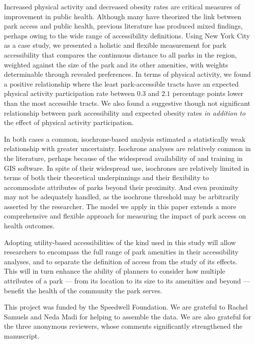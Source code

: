 \documentclass[shortAfour,sageh.bst]{sagej}
\begin{document}
Increased physical activity and decreased obesity rates are critical
measures of improvement in public health. Although many have theorized
the link between park access and public health, previous literature has
produced mixed findings, perhaps owing to the wide range of
accessibility definitions. Using New York City as a case study, we
presented a holistic and flexible measurement for park accessibility
that compares the continuous distance to all parks in the region,
weighted against the size of the park and its other amenities, with
weights determinable through revealed preferences. In terms of physical
activity, we found a positive relationship where the least
park-accessible tracts have an expected physical activity participation
rate between \(0.3\) and \(2.1\) percentage points lower than the most
accessible tracts. We also found a suggestive though not significant
relationship between park accessibility and expected obesity rates
\emph{in addition to} the effect of physical activity participation.

In both cases a common, isochrone-based analysis estimated a
statistically weak relationship with greater uncertainty. Isochrone
analyses are relatively common in the literature, perhaps because of the
widespread availability of and training in GIS software. In spite of
their widespread use, isochrones are relatively limited in terms of both
their theoretical underpinnings and their flexibility to accommodate
attributes of parks beyond their proximity. And even proximity may not
be adequately handled, as the isochrone threshold may be arbitrarily
asserted by the researcher. The model we apply in this paper extends a
more comprehensive and flexible approach for measuring the impact of
park access on health outcomes.

Adopting utility-based accessibilities of the kind used in this study
will allow researchers to encompass the full range of park amenities in
their accessibility analyses, and to separate the definition of access
from the study of its effects. This will in turn enhance the ability of
planners to consider how multiple attributes of a park --- from its
location to its size to its amenities and beyond --- benefit the health
of the community the park serves.

\begin{acks}
This project was funded by the Speedwell Foundation. We are grateful to Rachel
Samuels and Neda Madi for helping to assemble the data. We are also grateful for
the three anonymous reviewers, whose comments significantly strengthened the 
manuscript.
\end{acks}
\end{document}
